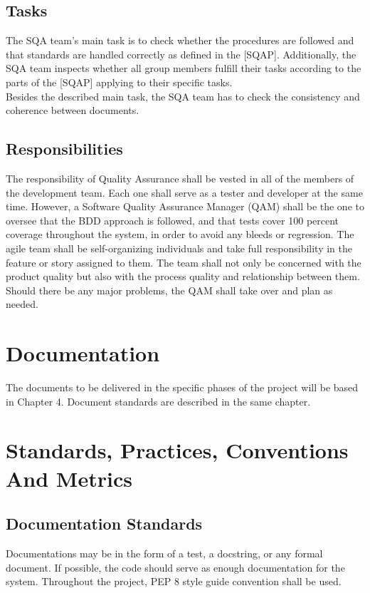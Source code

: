 \documentclass[12pt,letterpaper, margin=1in]{article}
\begin{document}
\subsection{Tasks}
The SQA team’s main task is to check whether the procedures are followed and that standards are handled correctly as defined in the [SQAP]. Additionally, the SQA team inspects whether all group members fulfill their tasks according to the parts of the [SQAP] applying to their specific tasks. \\

Besides the described main task, the SQA team has to check the consistency and coherence between documents.

\subsection{Responsibilities}
The responsibility of Quality Assurance shall be vested in all of the members of the development team. Each one shall serve as a tester and developer at the same time. However, a Software Quality Assurance Manager (QAM) shall be the one to oversee that the BDD approach is followed, and that tests cover 100 percent coverage throughout the system, in order to avoid any bleeds or regression. The agile team shall be self-organizing individuals and take full responsibility in the feature or story assigned to them. The team shall not only be concerned with the product quality but also with the process quality and relationship between them. Should there be any major problems, the QAM shall take over and plan as needed. 

\newpage
\section{Documentation}
The documents to be delivered in the specific phases of the project will be based in Chapter 4. Document standards are described in the same chapter.

\newpage
\section{Standards, Practices, Conventions And Metrics}
\subsection{Documentation Standards}
Documentations may be in the form of a test, a docstring, or any formal document. If possible, the code should serve as enough documentation for the system. Throughout the project, PEP 8 style guide convention shall be used. 
\end{document}
